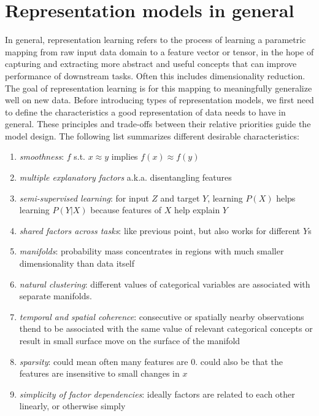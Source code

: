 \section{Representation models in general}
\label{sec-repr-models-general}
In general, representation learning refers to the process of learning 
a parametric mapping from raw input data domain
to a feature vector or tensor, in the hope of capturing and extracting more abstract and useful concepts
that can improve performance of downstream tasks.
Often this includes dimensionality reduction.
The goal of representation learning is for this mapping to meaningfully generalize well
on new data.
Before introducing types of representation models,
we first need to define the characteristics a good representation of data needs
to have in general. 
These principles and trade-offs between their relative priorities guide the model design.
The following list summarizes different desirable characteristics:
\begin{enumerate}
		\item \textit{smoothness}: $ f  $ s.t. $ x \approx y  $ implies
				$ f(x) \approx f (y)  $
		\item \textit{multiple explanatory factors} a.k.a. disentangling 
				features
		\item \textit{semi-supervised learning}: for input $ Z  $ and target $ Y  $,
				learning $ P (X)  $ helps learning $ P (Y|X)  $ because
				features of $ X  $ help explain $ Y  $
		\item \textit{shared factors across tasks}: like previous point,
				but also works for different $ Y  $s
		\item \textit{manifolds}: probability mass concentrates
				in regions with much smaller dimensionality than data itself
		\item \textit{natural clustering}: different values of categorical variables
				are associated with separate manifolds.
		\item \textit{temporal and spatial coherence}:
				consecutive or spatially nearby observations
				thend to be associated with the same value of relevant categorical
				concepts or result in small surface move on the surface of the manifold
		\item \textit{sparsity}: could mean often many features are 0. could also be
				that the features are insensitive to small changes in $ x  $
		\item \textit{simplicity of factor dependencies}: ideally factors are related
				to each other linearly, or otherwise simply
\end{enumerate}

